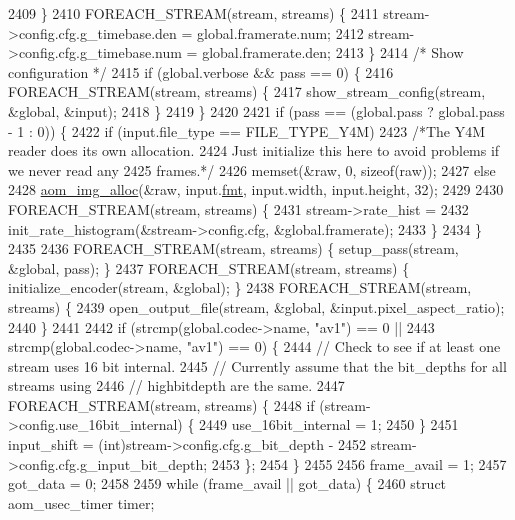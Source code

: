 \begin{DoxyCodeInclude}
{{{{{{{{{{{{{{{{{{{{{{{{{{{{{{{{{{{{{{{{{{{{{{{{{{{{{{{2409     \}
2410     FOREACH\_STREAM(stream, streams) \{
2411       stream->config.cfg.g\_timebase.den = global.framerate.num;
2412       stream->config.cfg.g\_timebase.num = global.framerate.den;
2413     \}
2414     \textcolor{comment}{/* Show configuration */}
2415     \textcolor{keywordflow}{if} (global.verbose && pass == 0) \{
2416       FOREACH\_STREAM(stream, streams) \{
2417         show\_stream\_config(stream, &global, &input);
2418       \}
2419     \}
2420 
2421     \textcolor{keywordflow}{if} (pass == (global.pass ? global.pass - 1 : 0)) \{
2422       \textcolor{keywordflow}{if} (input.file\_type == FILE\_TYPE\_Y4M)
2423         \textcolor{comment}{/*The Y4M reader does its own allocation.}
2424 \textcolor{comment}{          Just initialize this here to avoid problems if we never read any}
2425 \textcolor{comment}{          frames.*/}
2426         memset(&raw, 0, \textcolor{keyword}{sizeof}(raw));
2427       \textcolor{keywordflow}{else}
2428         \hyperlink{aom__image_8h_a570db29fbd122951235a08fe9375f6bb}{aom\_img\_alloc}(&raw, input.\hyperlink{structaom__image_a6c64b1ab918d80d52eb8f5d6d957e825}{fmt}, input.width, input.height, 32);
2429 
2430       FOREACH\_STREAM(stream, streams) \{
2431         stream->rate\_hist =
2432             init\_rate\_histogram(&stream->config.cfg, &global.framerate);
2433       \}
2434     \}
2435 
2436     FOREACH\_STREAM(stream, streams) \{ setup\_pass(stream, &global, pass); \}
2437     FOREACH\_STREAM(stream, streams) \{ initialize\_encoder(stream, &global); \}
2438     FOREACH\_STREAM(stream, streams) \{
2439       open\_output\_file(stream, &global, &input.pixel\_aspect\_ratio);
2440     \}
2441 
2442     \textcolor{keywordflow}{if} (strcmp(global.codec->name, \textcolor{stringliteral}{"av1"}) == 0 ||
2443         strcmp(global.codec->name, \textcolor{stringliteral}{"av1"}) == 0) \{
2444       \textcolor{comment}{// Check to see if at least one stream uses 16 bit internal.}
2445       \textcolor{comment}{// Currently assume that the bit\_depths for all streams using}
2446       \textcolor{comment}{// highbitdepth are the same.}
2447       FOREACH\_STREAM(stream, streams) \{
2448         \textcolor{keywordflow}{if} (stream->config.use\_16bit\_internal) \{
2449           use\_16bit\_internal = 1;
2450         \}
2451         input\_shift = (int)stream->config.cfg.g\_bit\_depth -
2452                       stream->config.cfg.g\_input\_bit\_depth;
2453       \};
2454     \}
2455 
2456     frame\_avail = 1;
2457     got\_data = 0;
2458 
2459     \textcolor{keywordflow}{while} (frame\_avail || got\_data) \{
2460       \textcolor{keyword}{struct }aom\_usec\_timer timer;
}}}}}}}}}}}}}}}}}}}}}}}}}}}}}}}}}}}}}}}}}}}}}}}}}}}}}}}
\end{DoxyCodeInclude}
